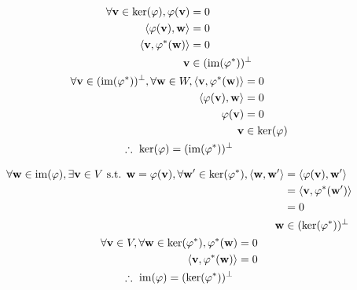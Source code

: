 \documentclass{mathtoolkit}
\begin{document}
\begin{p}
\begin{subp}
      \item
        \begin{gather*}
          \begin{aligned}
            \forall \vec{v} \in \ker{\varphi},
            \varphi(\vec{v}) & = 0 \\
            \ip{\varphi(\vec{v})}{\vec{w}} & = 0 \\
            \ip{\vec{v}}{\varphi^*(\vec{w})} & = 0 \\
            \vec{v} & \in (\im{\varphi^*})^\perp
          \end{aligned} \\
          \begin{aligned}
            \forall \vec{v} \in (\im{\varphi^*})^\perp, \forall \vec{w} \in W,
            \ip{\vec{v}}{\varphi^*(\vec{w})} & = 0 \\
            \ip{\varphi(\vec{v})}{\vec{w}} & = 0 \\
            \varphi(\vec{v}) & = 0 \\
            \vec{v} & \in \ker{\varphi}
          \end{aligned} \\
          \therefore \ker{\varphi} = (\im{\varphi^*})^\perp
        \end{gather*}

      \item
        \begin{gather*}
          \begin{aligned}
            \forall \vec{w} \in \im{\varphi},
            \exists \vec{v} \in V \st \vec{w} = \varphi(\vec{v}),
            \forall \vec{w}' \in \ker{\varphi^*},
            \ip{\vec{w}}{\vec{w}'}
            & = \ip{\varphi(\vec{v})}{\vec{w}'} \\
            & = \ip{\vec{v}}{\varphi^*(\vec{w}')} \\
            & = 0 \\
            \vec{w} & \in (\ker{\varphi^*})^\perp
          \end{aligned} \\
          \begin{aligned}
            \forall \vec{v} \in V,
            \forall \vec{w} \in \ker{\varphi^*},
            \varphi^*(\vec{w}) & = 0 \\
            \ip{\vec{v}}{\varphi^*(\vec{w})} & = 0 \\
          \end{aligned} \\
          \therefore \im{\varphi} = (\ker{\varphi^*})^\perp
        \end{gather*}


\end{subp}
\end{p}
\end{document}
